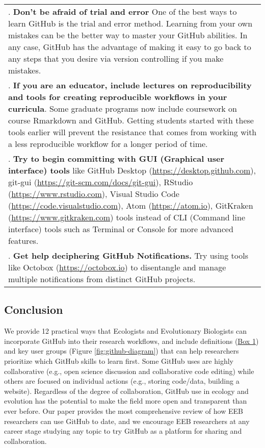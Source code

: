 \begin{tablenos:no-prefix-table-caption}
\begin{longtable}[]{@{}
  >{\raggedright\arraybackslash}p{}@{}}
7. \textbf{Don't be afraid of trial and error} One of the best ways to learn GitHub is the trial and error method. Learning from your own mistakes can be the better way to master your GitHub abilities. In any case, GitHub has the advantage of making it easy to go back to any steps that you desire via version controlling if you make mistakes. \\
8. \textbf{If you are an educator, include lectures on reproducibility and tools for creating reproducible workflows in your curricula}. Some graduate programs now include coursework on course Rmarkdown and GitHub. Getting students started with these tools earlier will prevent the resistance that comes from working with a less reproducible workflow for a longer period of time. \\
9. \textbf{Try to begin committing with GUI (Graphical user interface) tools} like GitHub Desktop (\url{https://desktop.github.com}), git-gui (\url{https://git-scm.com/docs/git-gui}), RStudio (\url{https://www.rstudio.com}), Visual Studio Code (\url{https://code.visualstudio.com}), Atom (\url{https://atom.io}), GitKraken (\url{https://www.gitkraken.com}) tools instead of CLI (Command line interface) tools such as Terminal or Console for more advanced features. \\
10. \textbf{Get help deciphering GitHub Notifications.} Try using tools like Octobox (\url{https://octobox.io}) to disentangle and manage multiple notifications from distinct GitHub projects. \\
\bottomrule
\end{longtable}

\end{tablenos:no-prefix-table-caption}

\hypertarget{conclusion}{%
\subsection{Conclusion}\label{conclusion}}

We provide 12 practical ways that Ecologists and Evolutionary Biologists can incorporate GitHub into their research workflows, and include definitions (\protect\hyperlink{definitions}{Box 1}) and key user groups (Figure \ref{fig:github-diagram}) that can help researchers prioritize which GitHub skills to learn first.
Some GitHub uses are highly collaborative (e.g., open science discussion and collaborative code editing) while others are focused on individual actions (e.g., storing code/data, building a website).
Regardless of the degree of collaboration, GitHub use in ecology and evolution has the potential to make the field more open and transparent than ever before.
Our paper provides the most comprehensive review of how EEB researchers can use GitHub to date, and we encourage EEB researchers at any career stage studying any topic to try GitHub as a platform for sharing and collaboration.

